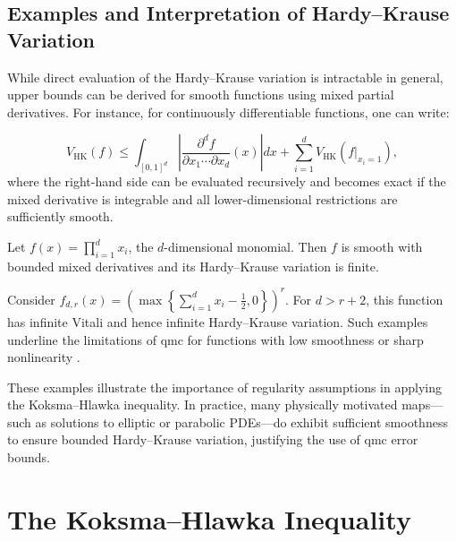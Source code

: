 \subsection{Examples and Interpretation of Hardy--Krause Variation}
\label{sec:hk-examples}

While direct evaluation of the Hardy--Krause variation is intractable in general, upper bounds can be derived for smooth functions using mixed partial derivatives. For instance, for continuously differentiable functions, one can write:

\begin{equation*}
    V_{\mathrm{HK}}(f) \leq \int_{[0,1]^d} \left| \frac{\partial^d f}{\partial x_1 \cdots \partial x_d}(x) \right| dx + \sum_{i=1}^d V_{\mathrm{HK}}(f|_{x_i = 1}),
\end{equation*}
where the right-hand side can be evaluated recursively and becomes exact if the mixed derivative is integrable and all lower-dimensional restrictions are sufficiently smooth.

\begin{example}
Let $f(x) = \prod_{i=1}^d x_i$, the $d$-dimensional monomial. Then $f$ is smooth with bounded mixed derivatives and its Hardy--Krause variation is finite.
\end{example}

\begin{example}
Consider $f_{d,r}(x) = \left( \max\left\{ \sum_{i=1}^d x_i - \frac{1}{2}, 0
\right\} \right)^r$. For $d > r + 2$, this function has infinite Vitali and
hence infinite Hardy--Krause variation. Such examples underline the limitations
of \ac{qmc} for functions with low smoothness or sharp nonlinearity
\cite[Prop. 16]{owen2005multidimensional}.
\end{example}

These examples illustrate the importance of regularity assumptions in applying
the Koksma--Hlawka inequality. In practice, many physically motivated maps—such
as solutions to elliptic or parabolic PDEs—do exhibit sufficient smoothness to
ensure bounded Hardy--Krause variation, justifying the use of \ac{qmc} error
bounds.

\section{The Koksma--Hlawka Inequality}

